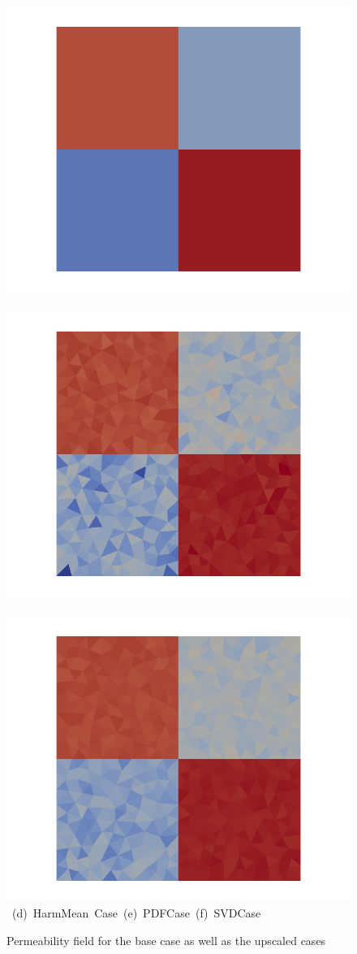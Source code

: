 \begin{landscape}
\begin{figure}[ht]
{\vspace{0.5cm}
\hbox{
      \includegraphics[width=.56\textwidth]{./Pics/HarmMeanCase/HarmMeanCase_PermField_withoutMesh2.png}
      \includegraphics[width=.56\textwidth]{./Pics/PDFCase/PDFCase_PermField_withoutMesh2.png} 
      \includegraphics[width=.56\textwidth]{./Pics/SVDCase/SVDCase_PermField_withoutMesh2.png}}
\vspace{0.cm}
\hbox{ \hspace{1.5cm} (d) HarmMean Case \hspace{4.75cm} (e) PDFCase  \hspace{5.0cm} (f) SVDCase}
\vspace{0.cm}
}   
\caption{Permeability field for the base case as well as the upscaled cases}
\label{fig:PermFields}
\end{figure}
\end{landscape}
\clearpage


